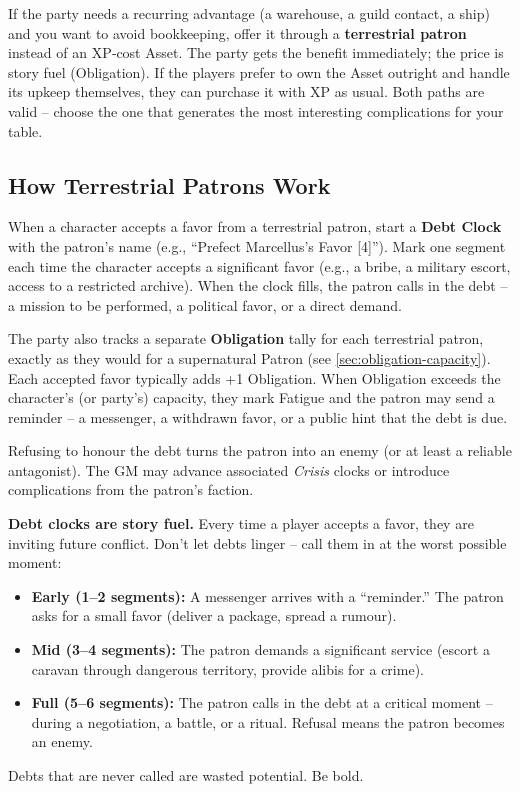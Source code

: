 \begin{tcolorbox}[colback=blue!5!white, colframe=blue!75!black, title={Asset or Patron? A GM’s Shortcut}]
If the party needs a recurring advantage (a warehouse, a guild contact, a ship) and you want to avoid bookkeeping, offer it through a \textbf{terrestrial patron} instead of an XP‑cost Asset. The party gets the benefit immediately; the price is story fuel (Obligation). If the players prefer to own the Asset outright and handle its upkeep themselves, they can purchase it with XP as usual. Both paths are valid – choose the one that generates the most interesting complications for your table.
\end{tcolorbox}

\subsection{How Terrestrial Patrons Work}
When a character accepts a favor from a terrestrial patron, start a \textbf{Debt Clock} with the patron’s name (e.g., “Prefect Marcellus’s Favor [4]”). Mark one segment each time the character accepts a significant favor (e.g., a bribe, a military escort, access to a restricted archive). When the clock fills, the patron calls in the debt – a mission to be performed, a political favor, or a direct demand.

The party also tracks a separate \textbf{Obligation} tally for each terrestrial patron, exactly as they would for a supernatural Patron (see \ref{sec:obligation-capacity}). Each accepted favor typically adds +1 Obligation. When Obligation exceeds the character’s (or party’s) capacity, they mark Fatigue and the patron may send a reminder – a messenger, a withdrawn favor, or a public hint that the debt is due.

Refusing to honour the debt turns the patron into an enemy (or at least a reliable antagonist). The GM may advance associated \textit{Crisis} clocks or introduce complications from the patron’s faction.

\begin{tcolorbox}[colback=gray!5!white, colframe=gray!75!black, title={Use Debt Clocks Aggressively}]
\textbf{Debt clocks are story fuel.} Every time a player accepts a favor, they are inviting future conflict. Don’t let debts linger – call them in at the worst possible moment:

\begin{itemize}
  \item \textbf{Early (1–2 segments):} A messenger arrives with a “reminder.” The patron asks for a small favor (deliver a package, spread a rumour).
  \item \textbf{Mid (3–4 segments):} The patron demands a significant service (escort a caravan through dangerous territory, provide alibis for a crime).
  \item \textbf{Full (5–6 segments):} The patron calls in the debt at a critical moment – during a negotiation, a battle, or a ritual. Refusal means the patron becomes an enemy.
\end{itemize}

Debts that are never called are wasted potential. Be bold.
\end{tcolorbox}

